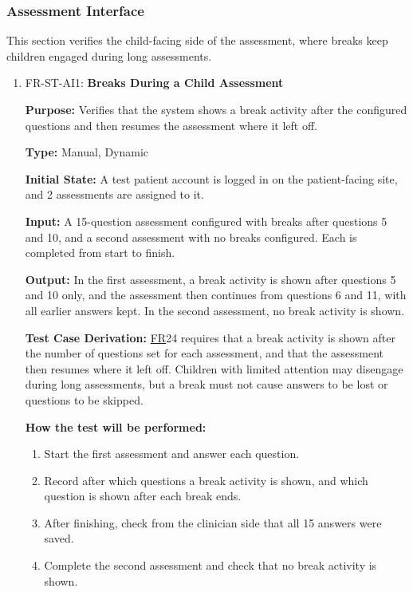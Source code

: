 \documentclass[12pt, titlepage]{article}
\newcommand{\srsfr}[1]{\href{https://github.com/Nour-Fawaz/MacaBoca/blob/main/pdfs/SRS/SRS.pdf}{FR}}
\renewcommand{\_}{\oldunderscore\allowbreak}
\begin{document}
\subsubsection{Assessment Interface}
This section verifies the child-facing side of the assessment, where breaks keep children engaged during long assessments.
\begin{enumerate}
  \item FR-ST-AI1: \textbf{Breaks During a Child Assessment\\}
  \begin{mdframed}[linewidth=0.5mm]
      \textbf{Purpose:} Verifies that the system shows a break activity after the configured questions and then resumes the assessment where it left off. \par
      \textbf{Type:} Manual, Dynamic \par
      \textbf{Initial State:} A test patient account is logged in on the patient-facing site, and 2 assessments are assigned to it. \par
      \textbf{Input:} A 15-question assessment configured with breaks after questions 5 and 10, and a second assessment with no breaks configured. Each is completed from start to finish. \par
      \textbf{Output:} In the first assessment, a break activity is shown after questions 5 and 10 only, and the assessment then continues from questions 6 and 11, with all earlier answers kept. In the second assessment, no break activity is shown. \par
      \textbf{Test Case Derivation:} \srsfr*{24} requires that a break activity is shown after the number of questions set for each assessment, and that the assessment then resumes where it left off. Children with limited attention may disengage during long assessments, but a break must not cause answers to be lost or questions to be skipped. \par
      \textbf{How the test will be performed:}
      \begin{enumerate}
        \item[1.] Start the first assessment and answer each question.
        \item[2.] Record after which questions a break activity is shown, and which question is shown after each break ends.
        \item[3.] After finishing, check from the clinician side that all 15 answers were saved.
        \item[4.] Complete the second assessment and check that no break activity is shown.
      \end{enumerate}
  \end{mdframed}
\end{enumerate}
\end{document}
